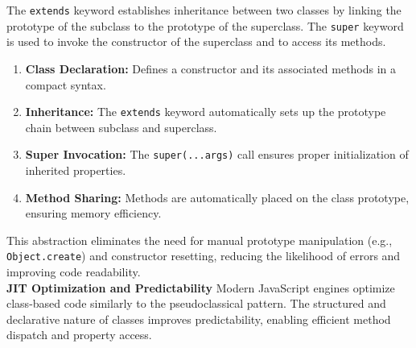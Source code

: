 \documentclass{scrbook}
\begin{document}
The \texttt{extends} keyword establishes inheritance between two classes by linking the prototype of the subclass to the prototype of the superclass. The \texttt{super} keyword is used to invoke the constructor of the superclass and to access its methods.

\begin{enumerate}
    \item \textbf{Class Declaration:} Defines a constructor and its associated methods in a compact syntax.
    \item \textbf{Inheritance:} The \texttt{extends} keyword automatically sets up the prototype chain between subclass and superclass.
    \item \textbf{Super Invocation:} The \texttt{super(...args)} call ensures proper initialization of inherited properties.
    \item \textbf{Method Sharing:} Methods are automatically placed on the class prototype, ensuring memory efficiency.
\end{enumerate}

This abstraction eliminates the need for manual prototype manipulation (e.g., \texttt{Object.create}) and constructor resetting, reducing the likelihood of errors and improving code readability.\\

\textbf{JIT Optimization and Predictability} Modern JavaScript engines optimize class-based code similarly to the pseudoclassical pattern. The structured and declarative nature of classes improves predictability, enabling efficient method dispatch and property access.
\end{document}
